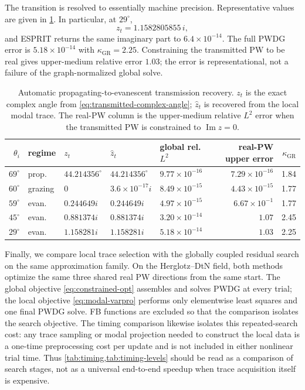 \documentclass[11pt]{article}
\newcommand{\ii}{i}
\newcommand{\GR}{\mathrm{GR}}
\renewcommand{\Im}{\operatorname{Im}}
\numberwithin{equation}{section}
\begin{document}
The transition is resolved to essentially machine precision.  Representative values are given in \cref{tab:transmission}.  In particular, at $29^\circ$,
\[
 z_t=1.1582805855\,\ii,
\]
and ESPRIT returns the same imaginary part to $6.4\times10^{-14}$.  The full PWDG error is $5.18\times10^{-14}$ with $\kappa_{\GR}=2.25$.  Constraining the transmitted PW to be real gives upper-medium relative error $1.03$; the error is representational, not a failure of the graph-normalized global solve.

\begin{table}[htbp]
\centering
\caption{Automatic propagating-to-evanescent transmission recovery.  $z_t$ is the exact complex angle from \eqref{eq:transmitted-complex-angle}; $\widehat z_t$ is recovered from the local modal trace.  The real-PW column is the upper-medium relative $L^2$ error when the transmitted PW is constrained to $\Im z=0$.}
\label{tab:transmission}
\footnotesize
\begin{tabular}{rllllrr}
\toprule
$\theta_i$ & regime & $z_t$ & $\widehat z_t$ & global rel. $L^2$ & real-PW upper error & $\kappa_{\GR}$\\
\midrule
$69^\circ$ & prop. & $44.214356^\circ$ & $44.214356^\circ$ & $9.77\times10^{-16}$ & $7.29\times10^{-16}$ & 1.84\\
$60^\circ$ & grazing & $0$ & $3.6\times10^{-17}\ii$ & $8.49\times10^{-15}$ & $4.43\times10^{-15}$ & 1.77\\
$59^\circ$ & evan. & $0.244649\ii$ & $0.244649\ii$ & $4.97\times10^{-15}$ & $6.67\times10^{-1}$ & 1.77\\
$45^\circ$ & evan. & $0.881374\ii$ & $0.881374\ii$ & $3.20\times10^{-14}$ & $1.07$ & 2.45\\
$29^\circ$ & evan. & $1.158281\ii$ & $1.158281\ii$ & $5.18\times10^{-14}$ & $1.03$ & 2.25\\
\bottomrule
\end{tabular}
\end{table}

Finally, we compare local trace selection with the globally coupled residual search on the same approximation family.
On the Herglotz--DtN field, both methods optimize the same three shared real PW directions from the same start.  The global objective \eqref{eq:constrained-opt} assembles and solves PWDG at every trial; the local objective \eqref{eq:modal-varpro} performs only elementwise least squares and one final PWDG solve.  FB functions are excluded so that the comparison isolates the search objective.  The timing comparison likewise isolates this repeated-search cost: any trace sampling or modal projection needed to construct the local data is a one-time preprocessing cost per update and is not included in either nonlinear trial time.  Thus \cref{tab:timing,tab:timing-levels} should be read as a comparison of search stages, not as a universal end-to-end speedup when trace acquisition itself is expensive.
\end{document}
